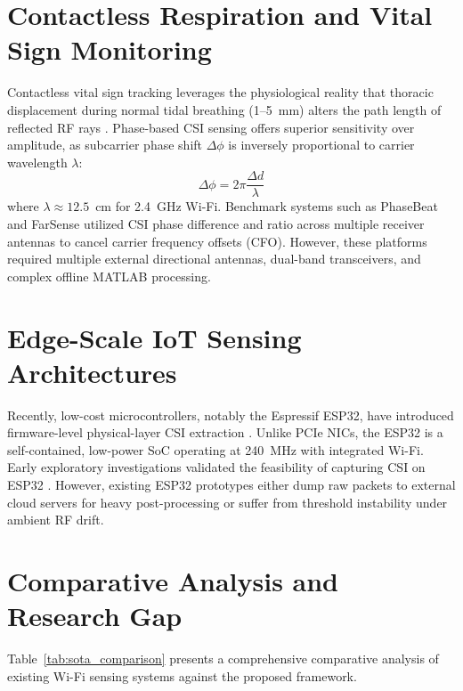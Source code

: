 \section{Contactless Respiration and Vital Sign Monitoring}
Contactless vital sign tracking leverages the physiological reality that thoracic displacement during normal tidal breathing (1--5~mm) alters the path length of reflected RF rays \cite{zeng2019farsense, liu2015tracking}. Phase-based CSI sensing offers superior sensitivity over amplitude, as subcarrier phase shift $\Delta \phi$ is inversely proportional to carrier wavelength $\lambda$:
\begin{equation}
\Delta \phi = 2\pi \frac{\Delta d}{\lambda}
\label{eq:phase_path_lit}
\end{equation}
where $\lambda \approx 12.5$~cm for 2.4~GHz Wi-Fi. Benchmark systems such as PhaseBeat \cite{liu2015tracking} and FarSense \cite{zeng2019farsense} utilized CSI phase difference and ratio across multiple receiver antennas to cancel carrier frequency offsets (CFO). However, these platforms required multiple external directional antennas, dual-band transceivers, and complex offline MATLAB processing.

\section{Edge-Scale IoT Sensing Architectures}
Recently, low-cost microcontrollers, notably the Espressif ESP32, have introduced firmware-level physical-layer CSI extraction \cite{hernandez2020lightweight}. Unlike PCIe NICs, the ESP32 is a self-contained, low-power SoC operating at 240~MHz with integrated Wi-Fi. Early exploratory investigations validated the feasibility of capturing CSI on ESP32 \cite{hernandez2020lightweight, guo2022device}. However, existing ESP32 prototypes either dump raw packets to external cloud servers for heavy post-processing or suffer from threshold instability under ambient RF drift.

\section{Comparative Analysis and Research Gap}
Table~\ref{tab:sota_comparison} presents a comprehensive comparative analysis of existing Wi-Fi sensing systems against the proposed framework.


